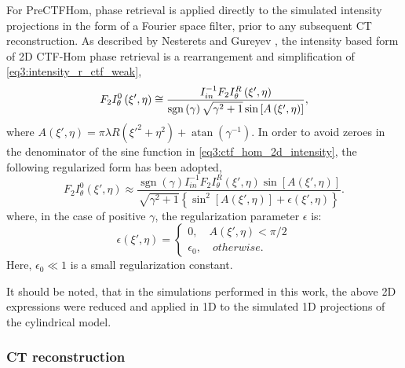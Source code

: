 \documentclass[twocolumn, switch]{article} %
\newcommand{\sgn}{\operatorname{sgn}}
\newcommand{\atan}{\operatorname{atan}}
\begin{document}
For PreCTFHom, phase retrieval is applied directly to the simulated intensity projections in the form of a Fourier space filter, prior to any subsequent CT reconstruction. As described by Nesterets and Gureyev \cite{Nesterets2014NoiseTomography}, the intensity based form of 2D CTF-Hom phase retrieval is a rearrangement and simplification of \cref{eq3:intensity_r_ctf_weak},
\begin{equation}
    \label{eq3:ctf_hom_2d_intensity}
    {F_2}I_\theta ^0\left( {\xi ',\eta} \right) \cong \frac{I_{in}^{-1}\space{F_2}I_\theta ^R\left( {\xi ',\eta} \right)}{\sgn \left(\gamma\right) \sqrt{\gamma^2 + 1}\sin{\left[A\left( {\xi ',\eta} \right) \right]}},
\end{equation}
where $A\left( {\xi ',\eta} \right) = \pi \lambda R \left(\xi '^2 + \eta^2\right) + \atan{\left(\gamma^{-1}\right)}$. In order to avoid zeroes in the denominator of the sine function in \cref{eq3:ctf_hom_2d_intensity}, the following regularized form \cite{Nesterets2014NoiseTomography} has been adopted,
\begin{equation}
    \label{eq3:ctf_hom_reg_2d_intensity}
    {F_2}I_\theta ^0\left( {\xi ',\eta} \right) \approx \frac{\sgn \left(\gamma\right)I_{in}^{-1} {F_2}I_\theta ^R\left( {\xi ',\eta} \right)\sin{\left[A\left( {\xi ',\eta} \right)\right]}}{\sqrt{\gamma^2 + 1}\left\{ \sin^2{\left[A\left( {\xi ',\eta} \right) \right]} + \epsilon\left({\xi ',\eta}\right) \right\}}.
\end{equation}
where, in the case of positive $\gamma$, the regularization parameter $\epsilon$ is:
\begin{equation}
    \label{eq3:ctf_hom_epsilon}
    \epsilon\left({\xi ',\eta}\right) = \left\{ 
        \begin{array}{l}
            0,\quad A\left( {\xi ',\eta} \right) < \pi/2\\
            \epsilon_0,\quad otherwise.
        \end{array} \right.
\end{equation}
Here, $\epsilon_0 \ll 1$ is a small regularization constant. 

It should be noted, that in the simulations performed in this work, the above 2D expressions were reduced and applied in 1D to the simulated 1D projections of the cylindrical model.

\subsubsection{CT reconstruction} \label{s3:sim_ctf_ct_recon}
\end{document}

